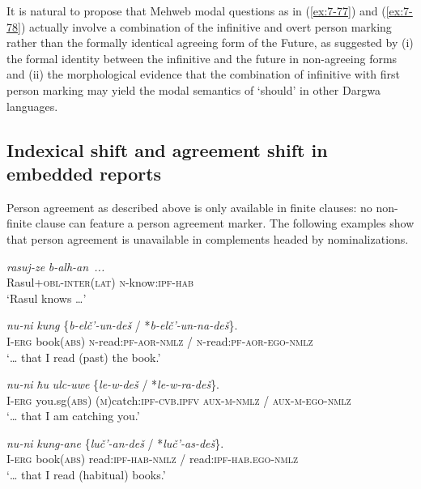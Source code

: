 ﻿\documentclass[output=paper]{langsci/langscibook}
\begin{document}
It is natural to propose that Mehweb modal questions as in (\ref{ex:7-77})
and (\ref{ex:7-78}) actually involve a combination of the infinitive and overt
person marking rather than the formally identical agreeing form of the Future, as suggested by (i) the formal identity between the infinitive
and the future in non-agreeing forms and (ii) the morphological evidence
that the combination of infinitive with first person marking may yield
the modal semantics of `should' in other Dargwa languages.

\subsection{Indexical shift and agreement shift in embedded
reports}\label{indexical-shift-and-agreement-shift-in-embedded-reports}

Person agreement as described above is only available in finite clauses:
no non-finite clause can feature a person agreement marker. The
following examples show that person agreement is unavailable in
complements headed by nominalizations.

\ea %
\gll \emph{rasuj-ze} \emph{b-alh-an~...}\\
Rasul+\textsc{obl}-\textsc{inter(lat)} \textsc{n}-know:\textsc{ipf}-\textsc{hab}\\
\glt `Rasul knows \ldots{}'

\ea %
\gll \emph{nu-ni} \emph{kung} \{\emph{b-elč'-un-deš} / *\emph{b-elč'-un-na-deš}\}.\\
I-\textsc{erg} book(\textsc{abs}) \textsc{n}-read:\textsc{pf}-\textsc{aor}-\textsc{nmlz} / \textsc{n}-read:\textsc{pf}-\textsc{aor}-\textsc{ego}-\textsc{nmlz}\\\unskip
\glt `\ldots{} that I read (past) the book.'

\ex %
\gll \emph{nu-ni} \emph{ħu} \emph{ulc-uwe} \{\emph{le-w-deš} / *\emph{le-w-ra-deš}\}.\\
I-\textsc{erg} you.sg(\textsc{abs}) (\textsc{m})catch:\textsc{ipf}-\textsc{cvb.ipfv} \textsc{aux}-\textsc{m}-\textsc{nmlz} / \textsc{aux}-\textsc{m}-\textsc{ego}-\textsc{nmlz}\\
\glt `\ldots{} that I am catching you.'

\ex %
\gll \emph{nu-ni} \emph{kung-ane} \{\emph{luč'-an-deš} / *\emph{luč'-as-deš}\}.\\
I-\textsc{erg} book(\textsc{abs}) read:\textsc{ipf}-\textsc{hab}-\textsc{nmlz} / read:\textsc{ipf}-\textsc{hab}.\textsc{ego}-\textsc{nmlz}\\
\glt `\ldots{} that I read (habitual) books.'
\z
\z
\end{document}
